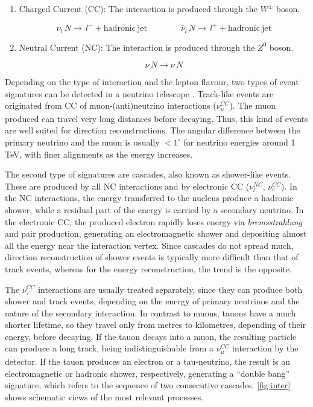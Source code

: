 \begin{enumerate}[label=\textbullet]
	\item Charged Current (CC): The interaction is produced through the $W^{\pm}$ boson.
    
	$$
    \nu_l \, N  \rightarrow  \,l^- +\mathrm{hadronic~jet} \qquad \qquad \bar{\nu}_l \, N  \rightarrow  \,l^+ +\mathrm{hadronic~jet}
    $$
    
	
	\item Neutral Current (NC): The interaction is produced through the $Z^0$ boson.
	
    $$
	\nu \, N  \rightarrow \nu \, N
	$$
	
\end{enumerate}

Depending on the type of interaction and the lepton flavour, two types of event signatures can be detected in a neutrino telescope \cite{inter}. Track-like events are originated from CC of muon-(anti)neutrino interactions ($\nu_\mu^{CC}$). The muon produced can travel very long distances before decaying. Thus, this kind of events are well suited for direction reconstructions. The angular difference between the primary neutrino and the muon is usually $<1^\circ$ for neutrino energies around 1 TeV, with finer alignments as the energy increases.

The second type of signatures are cascades, also known as shower-like events. These are produced by all NC interactions and by electronic CC ($\nu_l^{NC}$, $\nu_e^{CC}$). In the NC interactions, the energy transferred to the nucleus produce a hadronic shower, while a residual part of the energy is carried by a secondary neutrino. In the electronic CC, the produced electron rapidly loses energy via \textit{bremsstrahlung} and pair production, generating an electromagnetic shower and depositing almost all the energy near the interaction vertex. Since cascades do not spread much, direction reconstruction of shower events is typically more difficult than that of track events, whereas for the energy reconstruction, the trend is the opposite.

The $\nu_\tau^{CC}$ interactions are usually treated separately, since they can produce both shower and track events, depending on the energy of primary neutrinos and the nature of the secondary interaction. In contrast to muons, tauons have a much shorter lifetime, so they travel only from metres to kilometres, depending of their energy, before decaying. If the tauon decays into a muon, the resulting particle can produce a long track, being indistinguishable from a $\nu_\mu^{CC}$ interaction by the detector. If the tauon produces an electron or a tau-neutrino, the result is an electromagnetic or hadronic shower, respectively, generating a ``double bang'' signature, which refers to the sequence of two consecutive cascades. \autoref{fig:inter} shows schematic views of the most relevant processes.

